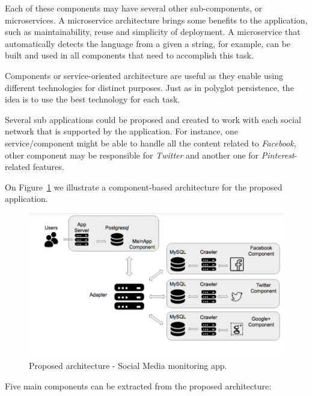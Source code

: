 Each of these components may have several other sub-components, or microservices. A microservice architecture brings some benefits to the application, such as maintainability, reuse and simplicity of deployment. A microservice that automatically detects the language from a given a string, for example, can be built and used in all components that need to accomplish this task. 

Components or service-oriented architecture are useful as they enable using different technologies for distinct purposes. Just as in polyglot persistence, the idea is to use the best technology for each task.

Several sub applications could be proposed and created to work with each social network that is supported by the application. For instance, one service/component might be able to handle all the content related to \textit{Facebook}, other component may be responsible for \textit{Twitter} and another one for \textit{Pinterest}-related features. 

On Figure~\ref{fig:apparchitecture} we illustrate a component-based architecture for the proposed application.

\begin{figure}[ht!]
\centering
\includegraphics[width=120mm]{Imagens/apparchitecture.png}
\caption{Proposed architecture - Social Media monitoring app.\label{fig:apparchitecture}}
\end{figure}

Five main components can be extracted from the proposed architecture: 


